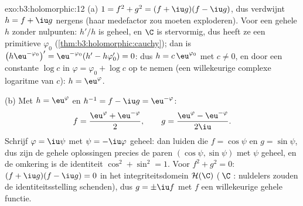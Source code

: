 \begin{solution}{exo:b3:holomorphic:12}
(a) $1 = f^2 + g^2 = (f + \iu g)(f - \iu g)$, dus verdwijnt $h =
f + \iu g$ nergens (haar medefactor zou moeten exploderen). Voor
een gehele $h$ zonder nulpunten: $h'/h$ is geheel, en $\C$ is
stervormig, dus heeft ze een primitieve $\varphi_0$
(\cref{thm:b3:holomorphic:cauchy}); dan is
$\bigl(h\eu^{-\varphi_0}\bigr)' = \eu^{-\varphi_0}(h' -
h\varphi_0') = 0$: dus $h = c\,\eu^{\varphi_0}$ met $c \neq 0$,
en door een constante $\log c$ in $\varphi = \varphi_0 + \log c$
op te nemen (een willekeurige complexe logaritme van $c$): $h =
\eu^{\varphi}$.

(b) Met $h = \eu^{\varphi}$ en $h^{-1} = f - \iu g =
\eu^{-\varphi}$:
\[
f = \frac{\eu^{\varphi} + \eu^{-\varphi}}2,
\qquad
g = \frac{\eu^{\varphi} - \eu^{-\varphi}}{2\iu} .
\]
Schrijf $\varphi = \iu\psi$ met $\psi = -\iu\varphi$ geheel: dan
luiden die $f = \cos\psi$ en $g = \sin\psi$, dus zijn de gehele
oplossingen precies de paren $(\cos\psi, \sin\psi)$ met $\psi$
geheel, en de omkering is de identiteit $\cos^2 + \sin^2 = 1$.
Voor $f^2 + g^2 = 0$: $(f + \iu g)(f - \iu g) = 0$ in het
integriteitsdomein $\mathcal H(\C)$ (\,$\C$ :
nuldelers zouden de identiteitsstelling schenden), dus $g =
\pm\iu f$ met $f$ een willekeurige gehele functie.
\end{solution}

